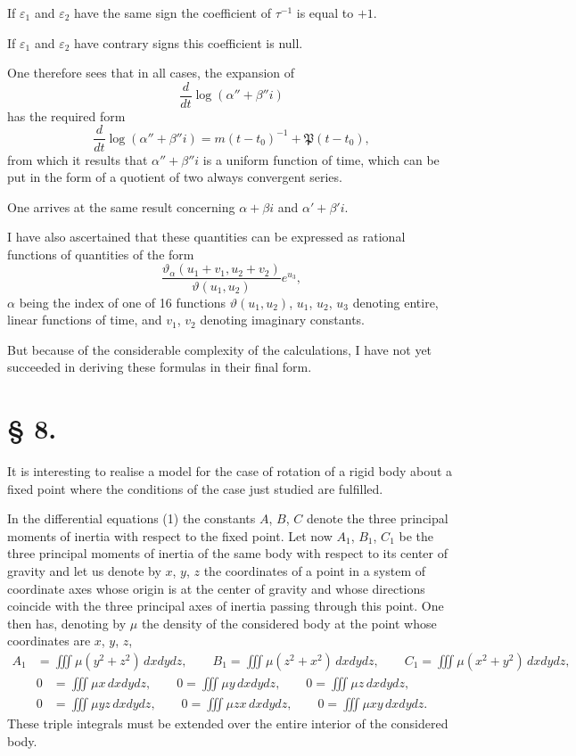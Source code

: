 \documentclass{article}
\begin{document}
If $\varepsilon_1$ and $\varepsilon_2$ have the same sign the coefficient of $\tau^{-1}$ is equal to $+1$.

If $\varepsilon_1$ and $\varepsilon_2$ have contrary signs this coefficient is null.

One therefore sees that in all cases, the expansion of
\[
\frac{d}{dt}\log(\alpha'' + \beta''i)
\]
has the required form
\[
\frac{d}{dt}\log(\alpha'' + \beta''i) = m(t - t_0)^{-1} + \mathfrak{P}(t - t_0),
\]
from which it results that $\alpha'' + \beta''i$ is a uniform function of time, which can be put in the form of a quotient of two always convergent series.

One arrives at the same result concerning $\alpha + \beta i$ and $\alpha' + \beta'i$.

I have also ascertained that these quantities can be expressed as rational functions of quantities of the form
\[
\frac{\vartheta_\alpha(u_1 + v_1, u_2 + v_2)}{\vartheta(u_1, u_2)}e^{u_3},
\]
$\alpha$ being the index of one of 16 functions $\vartheta(u_1, u_2)$, $u_1$, $u_2$, $u_3$ denoting entire, linear functions of time, and $v_1$, $v_2$ denoting imaginary constants.

But because of the considerable complexity of the calculations, I have not yet succeeded in deriving these formulas in their final form.


\section*{§ 8.}
\setcounter{equation}{0}

It is interesting to realise a model for the case of rotation of a rigid body about a fixed point where the conditions of the case just studied are fulfilled.

In the differential equations (1) the constants $A$, $B$, $C$ denote the three principal moments of inertia with respect to the fixed point.
Let now $A_1$, $B_1$, $C_1$ be the three principal moments of inertia of the same body with respect to its center of gravity and let us denote by $x$, $y$, $z$ the coordinates of a point in a system of coordinate axes whose origin is at the center of gravity and whose directions coincide with the three principal axes of inertia passing through this point.
One then has, denoting by $\mu$ the density of the considered body at the point whose coordinates are $x$, $y$, $z$,
\begin{align*}
A_1 &= \iiint\mu(y^2 + z^2)\,dxdydz, \qquad B_1 = \iiint\mu(z^2 + x^2)\,dxdydz, \qquad C_1 = \iiint\mu(x^2 + y^2)\,dxdydz, 
\end{align*}
\begin{align*}
0 &= \iiint\mu x\,dxdydz, \qquad 0 = \iiint\mu y\,dxdydz, \qquad 0 = \iiint\mu z\,dxdydz, \\
0 &= \iiint\mu yz\,dxdydz, \qquad 0 = \iiint\mu zx\,dxdydz, \qquad 0 = \iiint\mu xy\,dxdydz.
\end{align*}
These triple integrals must be extended over the entire interior of the considered body.
\end{document}
